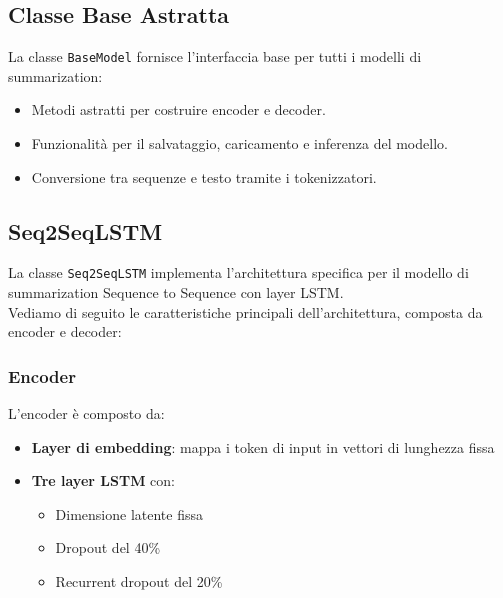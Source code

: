 \documentclass[a4paper, 12pt]{article}
\begin{document}
\subsection{Classe Base Astratta}
La classe \texttt{BaseModel} fornisce l'interfaccia base per tutti i modelli di summarization:
\begin{itemize}
    \item Metodi astratti per costruire encoder e decoder.
    \item Funzionalità per il salvataggio, caricamento e inferenza del modello.
    \item Conversione tra sequenze e testo tramite i tokenizzatori.
\end{itemize}

\subsection{Seq2SeqLSTM}
La classe \texttt{Seq2SeqLSTM} implementa l'architettura specifica per il modello di summarization Sequence to Sequence con layer LSTM.\\
Vediamo di seguito le caratteristiche principali dell'architettura, composta da encoder e decoder:

\subsubsection{Encoder}
L'encoder è composto da:
\begin{itemize}
    \item \textbf{Layer di embedding}: mappa i token di input in vettori di lunghezza fissa
    \item \textbf{Tre layer LSTM} con:
        \begin{itemize}
            \item Dimensione latente fissa
            \item Dropout del 40\% 
            \item Recurrent dropout del 20\% 
        \end{itemize}
\end{itemize}
\end{document}
